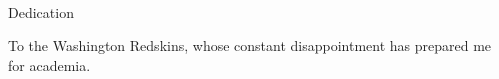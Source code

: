 
\renewcommand{\baselinestretch}{2}
\small\normalsize
\hbox{\ }

\vspace{-.65in}

\begin{center}
\large{Dedication}
\end{center}

To the Washington Redskins, whose constant disappointment has prepared me for academia.

